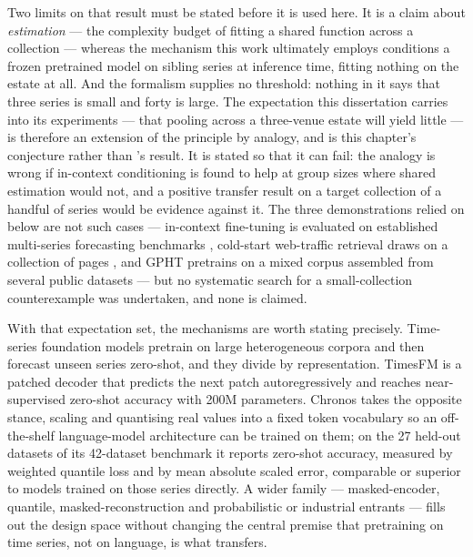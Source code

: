 Two limits on that result must be stated before it is used here. It is a claim
about \emph{estimation} --- the complexity budget of fitting a shared function
across a collection --- whereas the mechanism this work ultimately employs
conditions a frozen pretrained model on sibling series at inference time,
fitting nothing on the estate at all. And the formalism supplies no threshold:
nothing in it says that three series is small and forty is large. The
expectation this dissertation carries into its experiments --- that pooling
across a three-venue estate will yield little --- is therefore an extension of
the principle by analogy, and is this chapter's conjecture rather than
\citeauthor{montero-manso_principles_2021}'s result. It is stated so that it
can fail: the analogy is wrong if in-context conditioning is found to help at
group sizes where shared estimation would not, and a positive transfer result
on a target collection of a handful of series would be evidence against it. The
three demonstrations relied on below are not such cases --- in-context
fine-tuning is evaluated on established multi-series forecasting benchmarks
\citep{das_-context_2025}, cold-start web-traffic retrieval draws on a
collection of pages \citep{zhou_context-driven_2025}, and GPHT pretrains on a
mixed corpus assembled from several public datasets
\citep{liu_generative_2024} --- but no systematic search for a small-collection
counterexample was undertaken, and none is claimed.

With that expectation set, the mechanisms are worth stating precisely.
Time-series foundation models pretrain on large heterogeneous corpora and then
forecast unseen series zero-shot, and they divide by representation. TimesFM
\citep{das_decoder-only_2024} is a patched decoder that predicts the next patch
autoregressively and reaches near-supervised zero-shot accuracy with 200M
parameters. Chronos \citep{ansari_chronos_2024} takes the opposite stance,
scaling and quantising real values into a fixed token vocabulary so an
off-the-shelf language-model architecture can be trained on them; on the 27
held-out datasets of its 42-dataset benchmark it reports zero-shot accuracy,
measured by weighted quantile loss and by mean absolute scaled error,
comparable or superior to models trained on those series directly. A wider
family --- masked-encoder, quantile, masked-reconstruction and probabilistic or
industrial entrants
\citep{woo_unified_2024,liu_moirai_2026,goswami_moment_2024,rasul_lag-llama_2024,garza_timegpt-1_2024}
--- fills out the design space without changing the central premise that
pretraining on time series, not on language, is what transfers.

